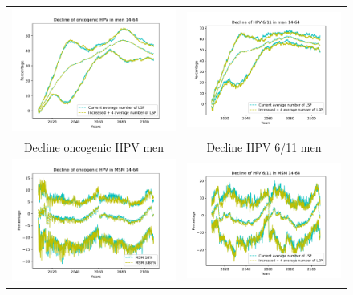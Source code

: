 \begin{figure}[!]
	\centering
	\begin{tabular}{cc}
		\includegraphics[width=0.5\linewidth]{IMGs/12.-Aumento_LSP/onco_hom.pdf}	& 
		\includegraphics[width=0.5\linewidth]{IMGs/12.-Aumento_LSP/verr_hom.pdf}  \\ 
		Decline oncogenic HPV men	& Decline HPV 6/11 men \\ 
		\includegraphics[width=0.5\linewidth]{IMGs/13.-Aumento_MSM/onco_MSM.pdf}	& 
		\includegraphics[width=0.5\linewidth]{IMGs/12.-Aumento_LSP/verr_MSM.pdf}  \\ 

\end{tabular}
\end{figure}
